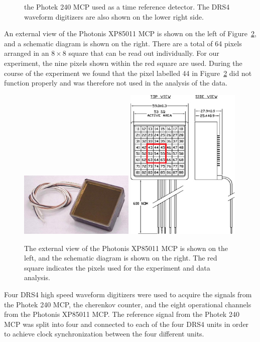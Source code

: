 \documentclass[12pt]{article}
\begin{document}
{\begin{figure}[htbp]
{    the Photek 240 MCP used as a time reference detector. The DRS4 waveform
    digitizers are also shown on the lower right side.}
  \label{fig:setup}
\end{figure}
An external view of the Photonis XP85011 MCP is shown on the left of
Figure~\ref{fig:photonis}, and a schematic diagram is shown on the right. There
are a total of 64 pixels arranged in an $8\times8$ square that can be read out
individually. For our experiment, the nine pixels shown within the red square
are used. During the course of the experiment we found that the pixel labelled
44 in Figure~\ref{fig:photonis} did not function properly and was therefore not 
used in the analysis of the data.
\begin{figure}[htbp] \centering
\includegraphics[width=0.49\textwidth]{Images/photonis/photonis.jpg}
\includegraphics[width=0.49\textwidth]{Images/photonis/photonis2.png}
\caption{The external view of the Photonis XP85011 MCP is shown on the left, and
the schematic diagram is shown on the right. The red square indicates the pixels
used for the experiment and data analysis.}
\label{fig:photonis}
\end{figure}
Four DRS4 high speed waveform digitizers were used to acquire the signals from
the Photek 240 MCP, the cherenkov counter, and the eight operational channels
from the Photonis XP85011 MCP. The reference signal from the Photek 240 MCP was 
split into four and connected to each of the four DRS4 units in order to achieve 
clock synchronization between the four different units. 
}
\end{document}
